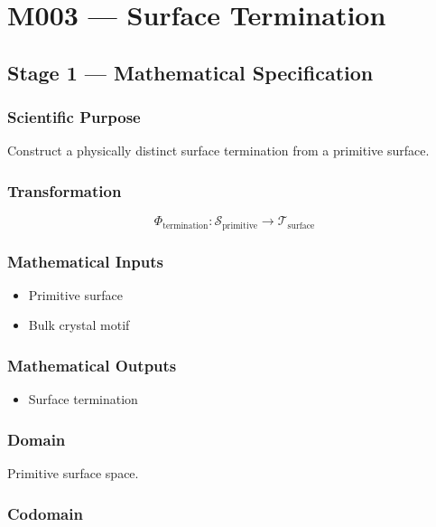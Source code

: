\chapter{M003 --- Surface Termination}

\section{Stage 1 --- Mathematical Specification}

\subsection{Scientific Purpose}

Construct a physically distinct surface termination from a primitive
surface.

\subsection{Transformation}

\[
\Phi_{\mathrm{termination}}:
\mathcal{S}_{\mathrm{primitive}}
\rightarrow
\mathcal{T}_{\mathrm{surface}}
\]

\subsection{Mathematical Inputs}

\begin{itemize}
\item Primitive surface
\item Bulk crystal motif
\end{itemize}

\subsection{Mathematical Outputs}

\begin{itemize}
\item Surface termination
\end{itemize}

\subsection{Domain}

Primitive surface space.

\subsection{Codomain}

